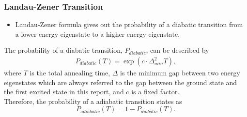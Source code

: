 \documentclass{beamer}
\begin{document}

\begin{frame}
	\frametitle{Landau-Zener Transition}
	\begin{itemize}
		\item Landau-Zener formula gives out the probability of a diabatic transition from a lower energy eigenstate to a higher energy eigenstate.

	\end{itemize}
	The probability of a diabatic transition, $P_{diabatic}$, can be described by \\
	\begin{equation*}
	\begin{split}
	P_{diabatic}(T) = \exp(c\cdot \Delta_{min}^2 T),
	\end{split}
	\end{equation*}
	where $T$ is the total annealing time, $\Delta$ is the minimum gap between two energy eigenstates which are always referred to the gap between the ground state and the first excited state in this report, and c is a fixed factor. \\
	Therefore, the probability of a adiabatic transition states as 
	\begin{equation*}
	P_{adiabatic}(T) = 1-P_{diabatic}(T).
	\end{equation*}
\end{frame}
\end{document}

